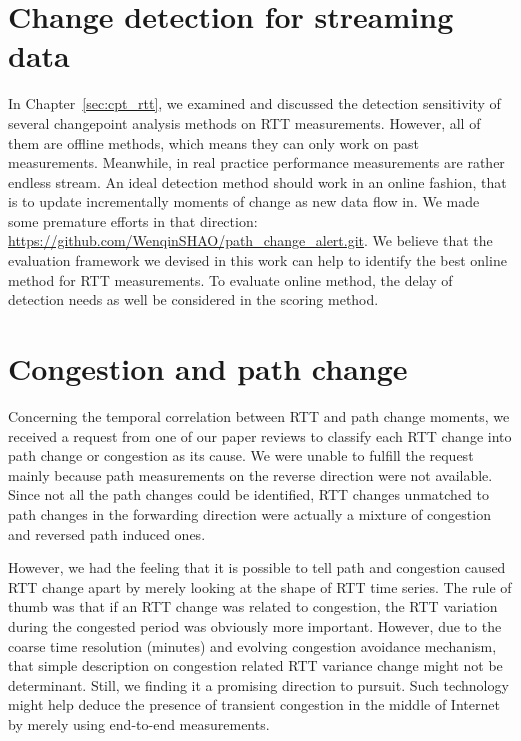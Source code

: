 \section{Change detection for streaming data}
In Chapter~\ref{sec:cpt_rtt}, we examined and discussed the detection sensitivity of several changepoint analysis methods on RTT measurements. However, all of them are offline methods, which means they can only work on past measurements. Meanwhile, in real practice performance measurements are rather endless stream. An ideal detection method should work in an online fashion, that is to update incrementally moments of change as new data flow in. We made some premature efforts in that direction: \url{https://github.com/WenqinSHAO/path_change_alert.git}. We believe that the evaluation framework we devised in this work can help to identify the best online method for RTT measurements.
To evaluate online method, the delay of detection needs as well be considered in the scoring method.

\section{Congestion and path change}
Concerning the temporal correlation between RTT and path change moments, we received a request from one of our paper reviews to classify each RTT change into path change or congestion as its cause. We were unable to fulfill the request mainly because path measurements on the reverse direction were not available. Since not all the path changes could be identified, RTT changes unmatched to path changes in the forwarding direction were actually a mixture of congestion and reversed path induced ones.

However, we had the feeling that it is possible to tell path and congestion caused RTT change apart by merely looking at the shape of RTT time series. The rule of thumb was that if an RTT change was related to congestion, the RTT variation during the congested period was obviously more important. However, due to the coarse time resolution (minutes) and evolving congestion avoidance mechanism, that simple description on congestion related RTT variance change might not be determinant. Still, we finding it a promising direction to pursuit. Such technology might help deduce the presence of transient congestion in the middle of Internet by merely using end-to-end measurements.

